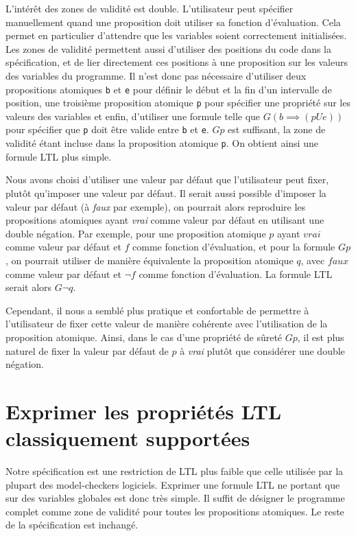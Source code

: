 L'intérêt des zones de validité est double. L'utilisateur peut spécifier
manuellement quand une proposition doit utiliser sa fonction d'évaluation. Cela
permet en particulier d'attendre que les variables soient correctement
initialisées. Les zones de validité permettent aussi d'utiliser des positions
du code dans la spécification, et de lier directement ces positions à une
proposition sur les valeurs des variables du programme. Il n'est donc pas
nécessaire d'utiliser deux propositions atomiques \texttt{b} et \texttt{e} pour
définir le début et la fin d'un intervalle de position, une troisième
proposition atomique \texttt{p} pour spécifier une propriété sur les valeurs des
variables et enfin, d'utiliser une formule telle que \(G (b \implies (p U e))\)
pour spécifier que \texttt{p} doit être valide entre \texttt{b} et \texttt{e}.
\(G p\) est suffisant, la zone de validité étant incluse dans la proposition
atomique \texttt{p}. On obtient ainsi une formule LTL plus simple.

Nous avons choisi d'utiliser une valeur par défaut que l'utilisateur peut fixer,
plutôt qu'imposer une valeur par défaut. Il serait aussi possible d'imposer la
valeur par défaut (à \emph{faux} par exemple), on pourrait alors
reproduire les propositions atomiques ayant \emph{vrai} comme valeur par
défaut en utilisant une double négation. Par exemple, pour une proposition
atomique \(p\) ayant \(vrai\) comme valeur par défaut et \(f\) comme fonction
d'évaluation, et pour la formule \(G p\), on pourrait utiliser de manière
équivalente la proposition atomique \(q\), avec \(faux\) comme valeur par défaut
et \(\lnot f\) comme fonction d'évaluation. La formule LTL serait alors \(G
\lnot q\).

Cependant, il nous a semblé plus pratique et confortable de permettre à
l'utilisateur de fixer cette valeur de manière cohérente avec
l'utilisation de la proposition atomique. Ainsi, dans le
cas d'une propriété de sûreté \(G p\), il est plus naturel de fixer la
valeur par défaut de \(p\) à \emph{vrai} plutôt que considérer une
double négation.

\section{Exprimer les propriétés LTL classiquement supportées}

Notre spécification est une restriction de \ac{LTL} plus faible que celle utilisée
par la plupart des model-checkers logiciels. Exprimer une formule \ac{LTL} ne
portant que sur des variables globales est donc très simple. Il suffit de
désigner le programme complet comme zone de validité pour toutes les
propositions atomiques. Le reste de la spécification est inchangé.

